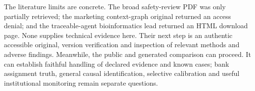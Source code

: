 The literature limits are concrete. The broad safety-review PDF was only
partially retrieved; the marketing context-graph original returned an access
denial; and the traceable-agent bioinformatics lead returned an HTML download
page. None supplies technical evidence here. Their next step is an authentic
accessible original, version verification and inspection of relevant methods
and adverse findings. Meanwhile, the public and generated comparison can
proceed. It can establish faithful handling of declared evidence and known
cases; bank assignment truth, general causal identification, selective
calibration and useful institutional monitoring remain separate questions.
\citep{exec16_report_contract}
\label{exec16:reporting-end}

